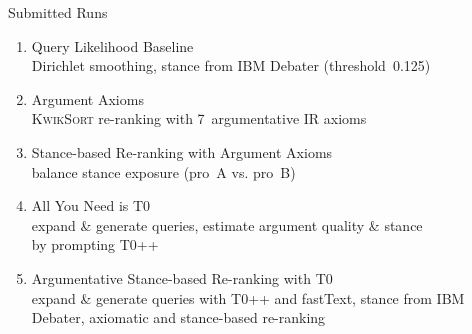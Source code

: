 \documentclass[english]{mlutalk}
\begin{document}
\begin{frame}{Submitted Runs}
  \begin{enumerate}
    \setlength{\itemsep}{2.5ex}
    \item Query Likelihood Baseline \\
    {\footnotesize Dirichlet smoothing, stance from IBM Debater (threshold~0.125)}
    \item Argument Axioms \\
    {\footnotesize \textsc{KwikSort} re-ranking with 7~argumentative IR axioms}
    \item Stance-based Re-ranking with Argument Axioms \\
    {\footnotesize balance stance exposure (pro~A vs. pro~B)}
    \item All You Need is T0 \\
    {\footnotesize expand \& generate queries, estimate argument quality \& stance \\ by prompting T0++}
    \item Argumentative Stance-based Re-ranking with T0 \\
    {\footnotesize expand \& generate queries with T0++ and fastText, stance from IBM Debater, axiomatic and stance-based re-ranking}
  \end{enumerate}
\end{frame}
\end{document}
